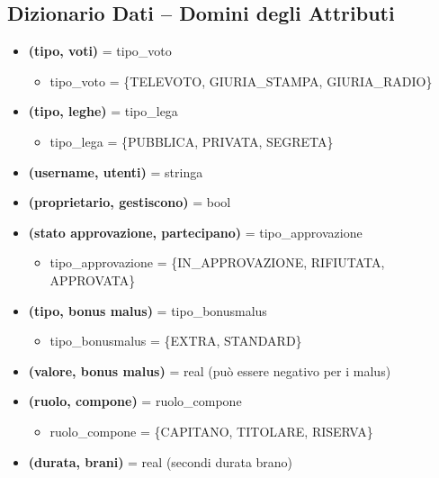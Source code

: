 \documentclass[a4paper,12pt]{article}
\begin{document}
\subsection{Dizionario Dati – Domini degli Attributi}
	\begin{itemize}
		\item \textbf{(tipo, voti)} = tipo\_voto
		\begin{itemize}
			\item tipo\_voto = \{TELEVOTO, GIURIA\_STAMPA, GIURIA\_RADIO\}
		\end{itemize}
		
		\item \textbf{(tipo, leghe)} = tipo\_lega
		\begin{itemize}
			\item tipo\_lega = \{PUBBLICA, PRIVATA, SEGRETA\}
		\end{itemize}
		
		\item \textbf{(username, utenti)} = stringa
		
		\item \textbf{(proprietario, gestiscono)} = bool
		
		\item \textbf{(stato approvazione, partecipano)} = tipo\_approvazione
		\begin{itemize}
			\item tipo\_approvazione = \{IN\_APPROVAZIONE, RIFIUTATA, APPROVATA\}
		\end{itemize}
		
		\item \textbf{(tipo, bonus malus)} = tipo\_bonusmalus
		\begin{itemize}
			\item tipo\_bonusmalus = \{EXTRA, STANDARD\}
		\end{itemize}
		
		\item \textbf{(valore, bonus malus)} = real (può essere negativo per i malus)
		
		\item \textbf{(ruolo, compone)} = ruolo\_compone
		\begin{itemize}
			\item ruolo\_compone = \{CAPITANO, TITOLARE, RISERVA\}
		\end{itemize}
		
		\item \textbf{(durata, brani)} = real (secondi durata brano)
	\end{itemize}
\newpage
\end{document}
